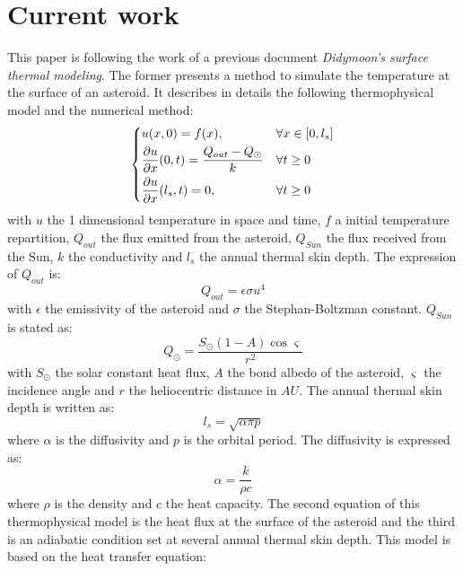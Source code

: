 \section{Current work}
\label{currentwork}

This paper is following the work of a previous document \textit{Didymoon's surface thermal modeling}. The former presents a method to simulate the temperature at the surface of an asteroid. It describes in details the following thermophysical model and the numerical method:
\begin{equation}
    \begin{dcases}
        u(x,0)=f(x),                                                  & \forall x\in[0,l_s] \\
        \frac{\partial{u}}{\partial{x}}(0,t)=\frac{Q_{out}-Q_{\odot}}{k} & \forall t\geq0      \\
        \frac{\partial{u}}{\partial{x}}(l_s,t)=0,                     & \forall t\geq0
    \end{dcases}
    \label{eq:2.1}
\end{equation}
with $u$ the 1 dimensional temperature in space and time, $f$ a initial temperature repartition, $Q_{out}$ the flux emitted from the asteroid, $Q_{Sun}$ the flux received from the Sun, $k$ the conductivity and $l_s$ the annual thermal skin depth. The expression of $Q_{out}$ is:
\begin{equation}
    Q_{out}=\epsilon\sigma u^4
    \label{eq:2.2}
\end{equation}
with $\epsilon$ the emissivity of the asteroid and $\sigma$ the Stephan-Boltzman constant. $Q_{Sun}$ is stated as:
\begin{equation}
    Q_{\odot}=\frac{S_{\odot}\left(1-A\right)\cos{\varsigma}}{r^2}
    \label{eq:2.3}
\end{equation}
with $S_{\odot}$ the solar constant heat flux, $A$ the bond albedo of the asteroid, $\varsigma$ the incidence angle and $r$ the heliocentric distance in $AU$. The annual thermal skin depth is written as:
\begin{equation}
    l_s=\sqrt{\alpha\pi p}
    \label{eq:2.4}
\end{equation}
where $\alpha$ is the diffusivity and $p$ is the orbital period. The diffusivity is expressed as:
\begin{equation}
    \alpha=\frac{k}{\rho c}
    \label{eq:2.5}
\end{equation}
where $\rho$ is the density and $c$ the heat capacity. The second equation of this thermophysical model is the heat flux at the surface of the asteroid and the third is an adiabatic condition set at several annual thermal skin depth. This model is based on the heat transfer equation:
